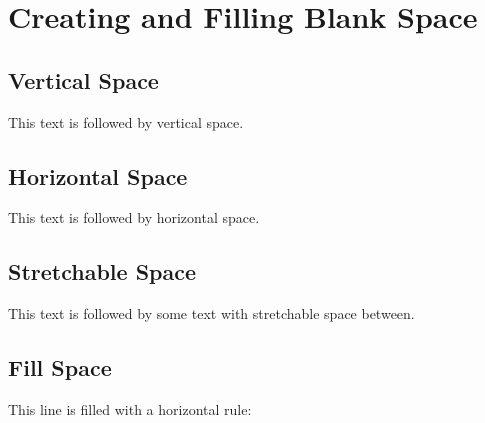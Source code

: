\documentclass{article}
\begin{document}
\section{Creating and Filling Blank Space}

\subsection{Vertical Space}
This text is followed by \vspace{2cm} vertical space.

\subsection{Horizontal Space}
This text is followed by \hspace{1cm} horizontal space.

\subsection{Stretchable Space}
This text is followed by some text with \hfill stretchable space \hfill between.

\subsection{Fill Space}
This line is filled with a horizontal rule: \hrulefill
\end{document}
